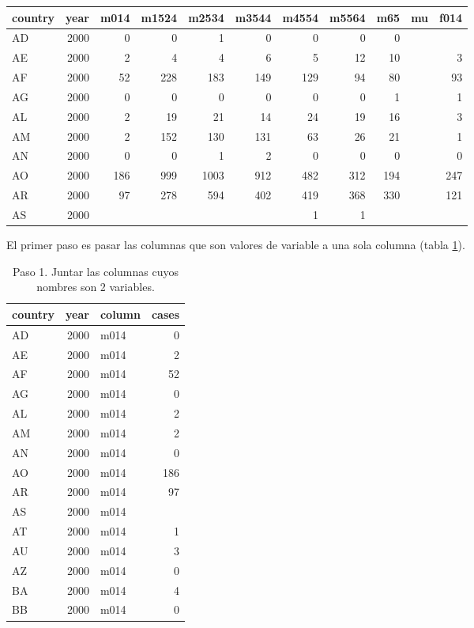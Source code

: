 \documentclass[]{article}
\begin{document}
\begin{table}[ht]
\centering
\begin{tabular}{lrrrrrrrrrr}
  \hline
country & year & m014 & m1524 & m2534 & m3544 & m4554 & m5564 & m65 & mu & f014 \\ 
  \hline
AD & 2000 &   0 &   0 &   1 &   0 &   0 &   0 &   0 &  &  \\ 
  AE & 2000 &   2 &   4 &   4 &   6 &   5 &  12 &  10 &  &   3 \\ 
  AF & 2000 &  52 & 228 & 183 & 149 & 129 &  94 &  80 &  &  93 \\ 
  AG & 2000 &   0 &   0 &   0 &   0 &   0 &   0 &   1 &  &   1 \\ 
  AL & 2000 &   2 &  19 &  21 &  14 &  24 &  19 &  16 &  &   3 \\ 
  AM & 2000 &   2 & 152 & 130 & 131 &  63 &  26 &  21 &  &   1 \\ 
  AN & 2000 &   0 &   0 &   1 &   2 &   0 &   0 &   0 &  &   0 \\ 
  AO & 2000 & 186 & 999 & 1003 & 912 & 482 & 312 & 194 &  & 247 \\ 
  AR & 2000 &  97 & 278 & 594 & 402 & 419 & 368 & 330 &  & 121 \\ 
  AS & 2000 &  &  &  &  &   1 &   1 &  &  &  \\ 
   \hline
\end{tabular}
\end{table}

El primer paso es pasar las columnas que son valores de variable a una
sola columna (tabla \ref{tab:tbjuntar}).

\begin{table}[ht]
\centering
\begin{tabular}{lrlr}
  \hline
country & year & column & cases \\ 
  \hline
AD & 2000 & m014 &   0 \\ 
  AE & 2000 & m014 &   2 \\ 
  AF & 2000 & m014 &  52 \\ 
  AG & 2000 & m014 &   0 \\ 
  AL & 2000 & m014 &   2 \\ 
  AM & 2000 & m014 &   2 \\ 
  AN & 2000 & m014 &   0 \\ 
  AO & 2000 & m014 & 186 \\ 
  AR & 2000 & m014 &  97 \\ 
  AS & 2000 & m014 &  \\ 
  AT & 2000 & m014 &   1 \\ 
  AU & 2000 & m014 &   3 \\ 
  AZ & 2000 & m014 &   0 \\ 
  BA & 2000 & m014 &   4 \\ 
  BB & 2000 & m014 &   0 \\ 
   \hline
\end{tabular}
\caption{Paso 1. Juntar las columnas cuyos nombres son 2 variables.} 
\label{tab:tbjuntar}
\end{table}
\end{document}
